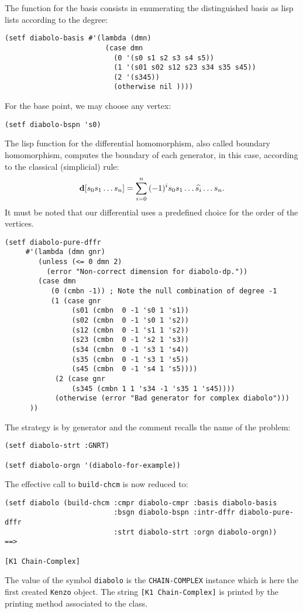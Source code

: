 The function for the basis consists  in enumerating the distinguished basis as lisp lists
according to the degree:
{\footnotesize\begin{verbatim}
(setf diabolo-basis #'(lambda (dmn)
                        (case dmn
                          (0 '(s0 s1 s2 s3 s4 s5))
                          (1 '(s01 s02 s12 s23 s34 s35 s45))
                          (2 '(s345))
                          (otherwise nil ))))
\end{verbatim}}
For the base point, we may choose any vertex:
{\footnotesize\begin{verbatim}
(setf diabolo-bspn 's0)
\end{verbatim}}
The lisp function for the differential homomorphism, also called boundary homomorphism,
computes the boundary of each generator, in this case,  according to the classical (simplicial) rule:
$$ {\bf d}[{s_0s_1\ldots s_n}] = \sum_{i=0}^n{(-1)^is_0s_1\ldots\widehat{s_i}\ldots s_n}.$$
It must be noted that our differential uses a predefined choice for the order of the vertices.
{\footnotesize\begin{verbatim}
(setf diabolo-pure-dffr
     #'(lambda (dmn gnr)
        (unless (<= 0 dmn 2)
          (error "Non-correct dimension for diabolo-dp."))
        (case dmn
           (0 (cmbn -1)) ; Note the null combination of degree -1
           (1 (case gnr
                (s01 (cmbn  0 -1 's0 1 's1))
                (s02 (cmbn  0 -1 's0 1 's2))
                (s12 (cmbn  0 -1 's1 1 's2))
                (s23 (cmbn  0 -1 's2 1 's3))
                (s34 (cmbn  0 -1 's3 1 's4))
                (s35 (cmbn  0 -1 's3 1 's5))
                (s45 (cmbn  0 -1 's4 1 's5))))
            (2 (case gnr
                (s345 (cmbn 1 1 's34 -1 's35 1 's45))))
            (otherwise (error "Bad generator for complex diabolo")))
      ))
\end{verbatim}}
The  strategy is by generator and the comment recalls the name of the problem:
{\footnotesize\begin{verbatim}
(setf diabolo-strt :GNRT)

(setf diabolo-orgn '(diabolo-for-example))
\end{verbatim}}
The effective call to {\tt build-chcm} is now reduced to:
{\footnotesize\begin{verbatim}
(setf diabolo (build-chcm :cmpr diabolo-cmpr :basis diabolo-basis
                          :bsgn diabolo-bspn :intr-dffr diabolo-pure-dffr
                          :strt diabolo-strt :orgn diabolo-orgn))       ==>

[K1 Chain-Complex]
\end{verbatim}}
The value of the symbol {\tt diabolo} is the {\tt CHAIN-COMPLEX}  instance which is here the first
created {\tt Kenzo} object. The string {\tt [K1 Chain-Complex]}
is printed by the printing method associated to the class.

